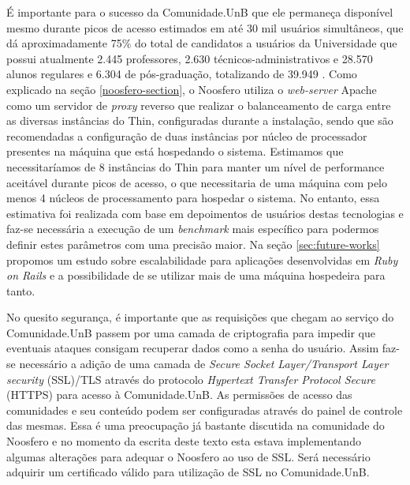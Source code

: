 É importante para o sucesso da Comunidade.UnB que ele permaneça disponível
mesmo durante picos de acesso estimados em até 30 mil usuários simultâneos,
que dá aproximadamente 75\% do total de candidatos a usuários da Universidade
que possui atualmente 2.445 professores, 2.630 técnicos-administrativos
e 28.570 alunos regulares e 6.304 de pós-graduação, totalizando de 39.949
\cite{unbInstituicao}. Como explicado na seção \ref{noosfero-section}, o Noosfero
utiliza o \textit{web-server} Apache como um servidor de \textit{proxy} reverso
que realizar o balanceamento de carga entre as diversas instâncias do Thin,
configuradas durante a instalação, sendo que são recomendadas a configuração de
duas instâncias por núcleo de processador presentes na máquina que está
hospedando o sistema.
%
Estimamos que necessitaríamos de 8 instâncias do Thin
para manter um nível de performance aceitável durante picos de acesso, o que
necessitaria de uma máquina com pelo menos 4 núcleos de processamento para
hospedar o sistema. No entanto, essa estimativa foi realizada com base em
depoimentos de usuários destas tecnologias e faz-se necessária a execução de
um \textit{benchmark} mais específico para podermos definir estes parâmetros com
uma precisão maior.
%
Na seção \ref{sec:future-works} propomos um estudo sobre escalabilidade para
aplicações desenvolvidas em \textit{Ruby on Rails} e a possibilidade de se
utilizar mais de uma máquina hospedeira para tanto.

No quesito segurança, é importante que as requisições que chegam ao serviço
do Comunidade.UnB passem por uma camada de criptografia para impedir que
eventuais ataques consigam recuperar dados como a senha do usuário. Assim faz-se
necessário a adição de uma camada de \textit{Secure Socket Layer/Transport
Layer security} (SSL)/TLS através do protocolo \textit{Hypertext Transfer
Protocol Secure} (HTTPS) para acesso à Comunidade.UnB. As permissões de acesso das
comunidades e seu conteúdo podem ser configuradas através do painel de controle
das mesmas. Essa é uma preocupação já bastante discutida na comunidade do
Noosfero e no momento da escrita deste texto esta estava implementando algumas
alterações para adequar o Noosfero ao uso de SSL. Será necessário adquirir um
certificado válido para utilização de SSL no Comunidade.UnB.


